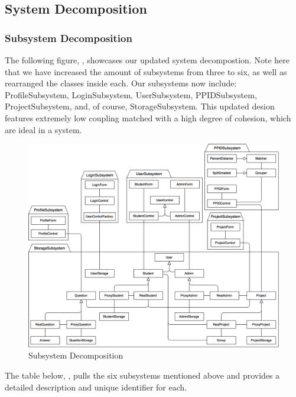 \documentclass[12pt,letterpaper]{article}
\begin{document}
\subsection{System Decomposition}
\subsubsection{Subsystem Decomposition}

The following figure, , showcases our updated system decompostion. Note here that we have increased the amount of subsystems from three to six, as well as rearranged the classes inside each. Our subsystems now include: ProfileSubsystem, LoginSubsystem, UserSubsystem, PPIDSubsystem, ProjectSubsystem, and, of course, StorageSubsystem. This updated desion features extremely low coupling matched with a high degree of cohesion, which are ideal in a system.

\begin{figure}[H]
	\centering{}
	\includegraphics[scale=0.25]{imgs/d3/decomp/repository.png}
	\caption{Subsystem Decomposition}
\end{figure}

The table below, , pulls the six subsystems mentioned above and provides a detailed description and unique identifier for each.
\end{document}
